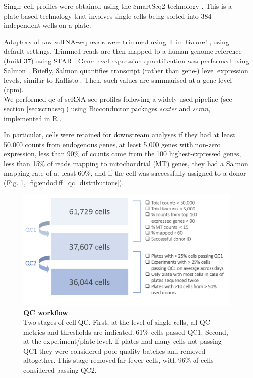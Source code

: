 Single cell profiles were obtained using the SmartSeq2 technology \cite{picelli2013smart}. 
This is a plate-based technology that involves single cells being sorted into 384 independent wells on a plate. 

Adaptors of raw scRNA-seq reads were trimmed using Trim Galore! \cite{galore2015wrapper, martin2011cutadapt, andrews2010fastqc}, using default settings. 
Trimmed reads are then mapped to a human genome reference (build 37) using STAR \cite{dobin2013star}. 
Gene-level expression quantification was performed using Salmon \cite{patro2017salmon}. 
Briefly, Salmon quantifies transcript (rather than gene-) level expression levels, similar to Kallisto \cite{bray2016near}.
Then, such values are summarised at a gene level (\gls{cpm}).\\


We performed \gls{qc} of scRNA-seq profiles following a widely used pipeline (see section \ref{sec:scrnaseq}) using Bioconductor packages \textit{scater} and \textit{scran}, implemented in R \cite{lun2016step, mccarthy2017scater, lun2019singlecellexperiment}.  

In particular, cells were retained for downstream analyses if they had at least 50,000 counts from endogenous genes, at least 5,000 genes with non-zero expression, less than 90\% of counts came from the 100 highest-expressed genes, less than 15\% of reads mapping to mitochondrial (MT) genes, they had a Salmon mapping rate of at least 60\%, and if the cell was successfully assigned to a donor (Fig. \ref{fig:endodiff_qc_workflow}, \ref{fig:endodiff_qc_distributions}). 

\begin{figure}[h]
\centering
\includegraphics[width=15cm]{Chapter4/Fig/endodiff_qc_workflow.png}
\caption[QC workflow]{\textbf{QC workflow}.\\
Two stages of cell QC.
First, at the level of single cells, all QC metrics and thresholds are indicated.
61\% cells passed QC1.
Second, at the experiment/plate level.
If plates had many cells not passing QC1 they were considered poor quality batches and removed altogether.
This stage removed far fewer cells, with 96\% of cells considered passing QC2.}
\label{fig:endodiff_qc_workflow}
\end{figure}

